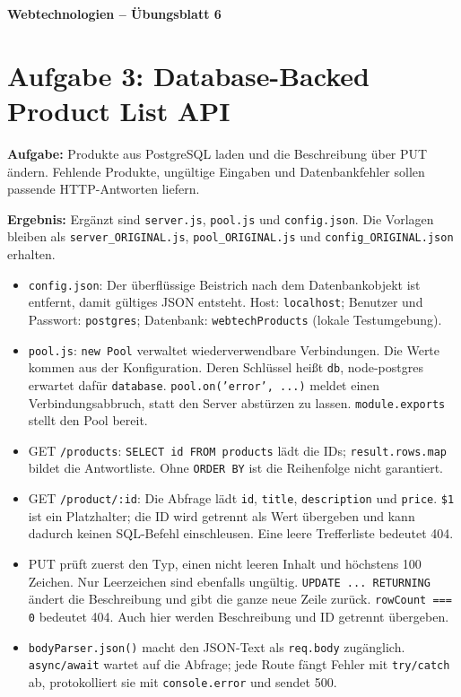 \documentclass[11pt,a4paper]{article}
\begin{document}
\begin{center}
  {\Large\textbf{Webtechnologien -- Übungsblatt 6}}
\end{center}
\section*{Aufgabe 3: Database-Backed Product List API}
\textbf{Aufgabe:} Produkte aus PostgreSQL laden und die Beschreibung
über PUT ändern. Fehlende Produkte, ungültige Eingaben und
Datenbankfehler sollen passende HTTP-Antworten liefern.

\medskip
\textbf{Ergebnis:} Ergänzt sind \texttt{server.js}, \texttt{pool.js} und
\texttt{config.json}. Die Vorlagen bleiben als \texttt{server\_ORIGINAL.js},
\texttt{pool\_ORIGINAL.js} und \texttt{config\_ORIGINAL.json} erhalten.
\begin{itemize}
  \item \texttt{config.json}: Der überflüssige Beistrich nach dem
    Datenbankobjekt ist entfernt, damit gültiges JSON entsteht.
    Host: \texttt{localhost}; Benutzer und Passwort: \texttt{postgres};
    Datenbank: \texttt{webtechProducts} (lokale Testumgebung).
  \item \texttt{pool.js}: \texttt{new Pool} verwaltet wiederverwendbare
    Verbindungen. Die Werte kommen aus der Konfiguration.
    Deren Schlüssel heißt \texttt{db}, node-postgres erwartet dafür
    \texttt{database}. \texttt{pool.on('error', ...)} meldet einen
    Verbindungsabbruch, statt den Server abstürzen zu lassen.
    \texttt{module.exports} stellt den Pool bereit.
  \item GET \texttt{/products}: \texttt{SELECT id FROM products} lädt
    die IDs; \texttt{result.rows.map} bildet die Antwortliste.
    Ohne \texttt{ORDER BY} ist die Reihenfolge nicht garantiert.
  \item GET \texttt{/product/:id}: Die Abfrage lädt \texttt{id},
    \texttt{title}, \texttt{description} und \texttt{price}.
    \texttt{\$1} ist ein Platzhalter; die ID wird getrennt als Wert
    übergeben und kann dadurch keinen SQL-Befehl einschleusen.
    Eine leere Trefferliste bedeutet 404.
  \item PUT prüft zuerst den Typ, einen nicht leeren Inhalt und höchstens
    100 Zeichen. Nur Leerzeichen sind ebenfalls ungültig.
    \texttt{UPDATE ... RETURNING} ändert die Beschreibung und gibt die
    ganze neue Zeile zurück. \texttt{rowCount === 0} bedeutet 404.
    Auch hier werden Beschreibung und ID getrennt übergeben.
  \item \texttt{bodyParser.json()} macht den JSON-Text als
    \texttt{req.body} zugänglich. \texttt{async/await} wartet auf die
    Abfrage; jede Route fängt Fehler mit \texttt{try/catch} ab,
    protokolliert sie mit \texttt{console.error} und sendet 500.
\end{itemize}
\end{document}
